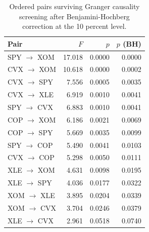\begin{table}[htbp]
\centering
\caption{Ordered pairs surviving Granger causality screening after Benjamini-Hochberg correction at the 10 percent level.} 
\label{tab:granger_shortlist}
\begin{tabular}{lrrr}
  \toprule
Pair & $F$ & $p$ & $p$ (BH) \\ 
  \midrule
SPY $\rightarrow$ XOM & 17.018 & 0.0000 & 0.0000 \\ 
  CVX $\rightarrow$ XOM & 10.618 & 0.0000 & 0.0002 \\ 
  CVX $\rightarrow$ SPY & 7.556 & 0.0005 & 0.0035 \\ 
  CVX $\rightarrow$ XLE & 6.919 & 0.0010 & 0.0041 \\ 
  SPY $\rightarrow$ CVX & 6.883 & 0.0010 & 0.0041 \\ 
  COP $\rightarrow$ XOM & 6.186 & 0.0021 & 0.0069 \\ 
  COP $\rightarrow$ SPY & 5.669 & 0.0035 & 0.0099 \\ 
  SPY $\rightarrow$ COP & 5.490 & 0.0041 & 0.0103 \\ 
  CVX $\rightarrow$ COP & 5.298 & 0.0050 & 0.0111 \\ 
  XLE $\rightarrow$ XOM & 4.631 & 0.0098 & 0.0195 \\ 
  XLE $\rightarrow$ SPY & 4.036 & 0.0177 & 0.0322 \\ 
  XOM $\rightarrow$ XLE & 3.895 & 0.0204 & 0.0339 \\ 
  XOM $\rightarrow$ CVX & 3.704 & 0.0246 & 0.0379 \\ 
  XLE $\rightarrow$ CVX & 2.961 & 0.0518 & 0.0740 \\ 
   \bottomrule
\end{tabular}
\end{table}
